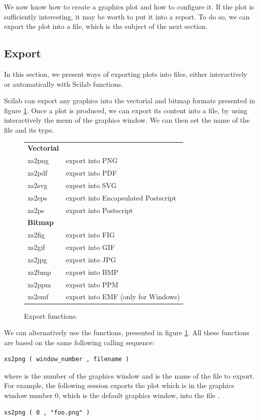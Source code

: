 We now know how to create a graphics plot and how to configure it.
If the plot is sufficiently interesting, it may be worth to put it into a report. 
To do so, we can export the plot 
into a file, which is the subject of the next section.

\subsection{Export}
In this section, we present ways of exporting 
plots into files, either interactively or 
automatically with Scilab functions.

Scilab can export any graphics into the 
vectorial and bitmap formats presented in figure \ref{fig-scilab-exportfile}.
Once a plot is produced, we can export its content into 
a file, by using interactively the  menu
of the graphics window. We can then set the name of the file and 
its type.


\begin{figure}
\begin{center}
\begin{tabular}{|l|l|}
\hline
\textbf{Vectorial} & \\
xs2png & export into PNG \\
xs2pdf & export into PDF \\
xs2svg & export into SVG \\
xs2eps & export into Encapsulated Postscript \\
xs2ps & export into Postscript \\
\hline
\textbf{Bitmap} & \\
xs2fig & export into FIG  \\
xs2gif & export into GIF  \\
xs2jpg & export into JPG  \\
xs2bmp & export into BMP  \\
xs2ppm & export into PPM \\
xs2emf & export into EMF  (only for Windows)\\
\hline
\end{tabular}
\end{center}
\caption{Export functions.}
\label{fig-scilab-exportfile}
\end{figure}

We can alternatively use the  functions, presented in 
figure \ref{fig-scilab-exportfile}.
All these functions are based on the same following calling sequence:
\lstset{language=scilabscript}
\begin{lstlisting}
xs2png ( window_number , filename )
\end{lstlisting}
where  is the number of the graphics window
and  is the name of the file to export.
For example, the following session exports the plot which is in the 
graphics window number 0, which is the default graphics window,   
into the file .
\lstset{language=scilabscript}
\begin{lstlisting}
xs2png ( 0 , "foo.png" )
\end{lstlisting}

